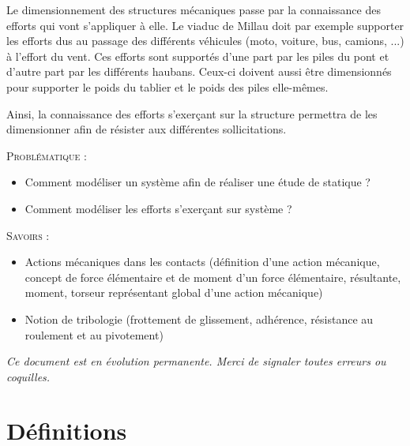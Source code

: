 \documentclass[11pt,oneside]{article}
\begin{document}
Le dimensionnement des structures mécaniques passe par la connaissance des efforts qui vont s'appliquer à elle. Le viaduc de Millau doit par exemple supporter les efforts dus au passage des différents véhicules (moto, voiture, bus, camions, ...) à l'effort du vent. Ces efforts sont supportés d'une part par les piles du pont et d'autre part par les différents haubans. Ceux-ci doivent aussi être dimensionnés pour supporter le poids du tablier et le poids des piles elle-mêmes.

Ainsi, la connaissance des efforts s'exerçant sur la structure permettra de les dimensionner afin de résister aux différentes sollicitations.

\vspace{.2cm}

\begin{prob}
\textsc{Problématique :}
\begin{itemize}
\item Comment modéliser un système afin de réaliser une étude de statique ?
\item Comment modéliser les efforts s'exerçant sur système ?
\end{itemize}
\end{prob}

\begin{savoir}
\textsc{Savoirs :}
\begin{itemize}
\item Actions mécaniques dans les contacts (définition d'une action mécanique, concept de force élémentaire et de moment d'un force élémentaire, résultante, moment, torseur représentant global d'une action mécanique)
\item Notion de tribologie (frottement de glissement, adhérence, résistance au roulement et au pivotement)
\end{itemize}
\end{savoir}

\setlength{\parskip}{0ex plus 0.2ex minus 0ex}
 \renewcommand{\contentsname}{}
 \renewcommand{\baselinestretch}{1}

\tableofcontents

 \renewcommand{\baselinestretch}{1.2}
\setlength{\parskip}{2ex plus 0.5ex minus 0.2ex}

\textit{Ce document est en évolution permanente. Merci de signaler toutes
erreurs ou coquilles.}

\section{Définitions}
\end{document}
